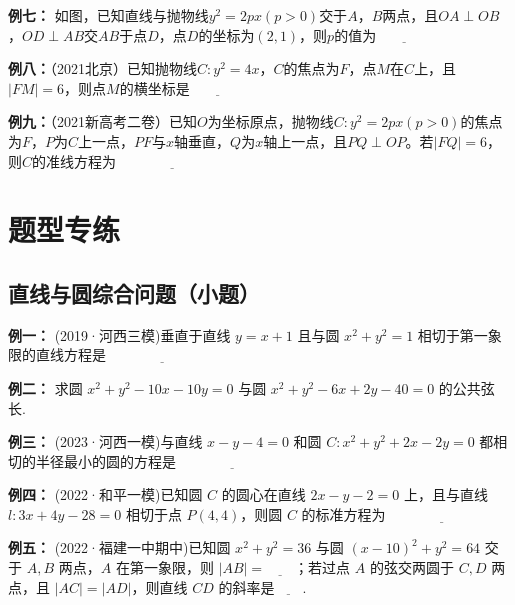 \documentclass{article}
\begin{document}
\textbf{例七：} 如图，已知直线与抛物线$y^2=2px(p>0)$交于$A$，$B$两点，且$OA \perp OB$，$OD \perp AB$交$AB$于点$D$，点$D$的坐标为$(2,1)$，则$p$的值为$\underline{\qquad\qquad}$ 
\vspace{2\baselineskip}

\textbf{例八：}（2021北京）已知抛物线$C:y^2=4x$，$C$的焦点为$F$，点$M$在$C$上，且$|FM|=6$，则点$M$的横坐标是$\underline{\qquad\qquad}$ 
\vspace{2\baselineskip}

\textbf{例九：}（2021新高考二卷）已知$O$为坐标原点，抛物线$C:y^2=2px(p>0)$的焦点为$F$，$P$为$C$上一点，$PF$与$x$轴垂直，$Q$为$x$轴上一点，且$PQ \perp OP$。若$|FQ|=6$，则$C$的准线方程为$\underline{\qquad\qquad\qquad\qquad}$ 
\vspace{2\baselineskip}

\newpage

\section{题型专练}
\subsection{直线与圆综合问题（小题）}

\noindent\textbf{例一： }(2019·河西三模)垂直于直线 $y=x+1$ 且与圆 $x^2+y^2=1$ 相切于第一象限的直线方程是$\underline{\qquad\qquad\qquad\qquad}$   \vspace{2\baselineskip}

\noindent\textbf{例二： }求圆 $x^2+y^2-10x-10y=0$ 与圆 $x^2+y^2-6x+2y-40=0$ 的公共弦长.   \vspace{2\baselineskip}

\noindent\textbf{例三： }(2023·河西一模)与直线 $x-y-4=0$ 和圆 $C:x^2+y^2+2x-2y=0$ 都相切的半径最小的圆的方程是$\underline{\qquad\qquad\qquad\qquad}$   \vspace{2\baselineskip}

\noindent\textbf{例四： }(2022·和平一模)已知圆 $C$ 的圆心在直线 $2x-y-2=0$ 上，且与直线 $l:3x+4y-28=0$ 相切于点 $P(4,4)$，则圆 $C$ 的标准方程为$\underline{\qquad\qquad\qquad\qquad}$   \vspace{2\baselineskip}

\noindent\textbf{例五： }(2022·福建一中期中)已知圆 $x^2+y^2=36$ 与圆 $(x-10)^2+y^2=64$ 交于 $A,B$ 两点，$A$ 在第一象限，则 $|AB|=\underline{\qquad}$；若过点 $A$ 的弦交两圆于 $C,D$ 两点，且 $|AC|=|AD|$，则直线 $CD$ 的斜率是$\underline{\qquad}$.   \vspace{2\baselineskip}
\end{document}
